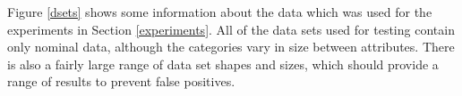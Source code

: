 
Figure \ref{dsets} shows some information about the data which was used for the experiments in Section \ref{experiments}. All of the data sets used for testing contain only nominal data, although the categories vary in size between attributes. There is also a fairly large range of data set shapes and sizes, which should provide a range of results to prevent false positives.


